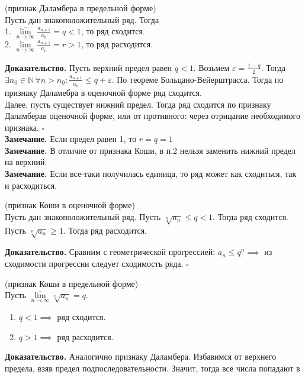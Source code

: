 \begin{theor}
    (признак Даламбера в предельной форме)\\
    Пусть дан знакоположительный ряд. Тогда\\
    1. $\overline{\lim\limits_{n \to \infty} }\frac{a_{n+1}}{a_n}=q<1$, 
    то ряд сходится.\\
    2. $\underline{\lim\limits_{n \to \infty} }\frac{a_{n+1}}{a_n}=r>1$,
    то ряд расходится.
\end{theor}
\textbf{Доказательство.}  
Пусть верхний предел равен $q<1$. Возьмем  $\varepsilon=\frac{1-q}{2}$.
Тогда $\exists n_0\in \mathbb{N}\, \forall n>n_0: \frac{a_{n+1}}{a_n}\leqslant 
q+\varepsilon$. По теореме Больцано-Вейерштрасса. Тогда по признаку
Даламебра в оценочной форме ряд сходится. \\
Далее, пусть существует нижний предел. Тогда ряд сходится
по признаку Даламберав оценочной форме, или от противного: через отрицание
необходимого признака.
$\square$\\ 
\textbf{Замечание.} Если предел равен 1, то $r=q=1$ \\
\textbf{Замечание.} В отличие от признака Коши, в п.2 нельзя заменить
нижний предел на верхний. \\
\textbf{Замечание.} Если все-таки получилась единица, то ряд может как 
сходиться, так и расходиться. 
\begin{theor}
    (признак Коши в оценочной форме)\\
    Пусть дан знакоположительный ряд. Пусть 
    $\sqrt[n]{a_n}\leqslant q<1$. Тогда ряд
    сходится. \\
    Пусть $\sqrt[n]{a_n}\geqslant1$. Тогда ряд
    расходится.
\end{theor}
\textbf{Доказательство.} Сравним с геометрической прогрессией:
$a_n\leqslant q^n\implies$ из сходимости прогрессии следует сходимость 
ряда. 
$\square$ 
\begin{theor}
    (признак Коши в предельной форме)\\
    Пусть $\overline{\lim\limits_{n \to \infty} }\sqrt[n]{a_n}=q$.\\
    \begin{enumerate}
        \item $q<1 \implies$ ряд сходится.
        \item $q>1\implies$ ряд расходится.
    \end{enumerate}
\end{theor}
\textbf{Доказательство.} Аналогично признаку Даламбера. Избавимся от верхнего 
предела, взяв предел подпоследовательности. Значит, тогда все числа попадают в 
